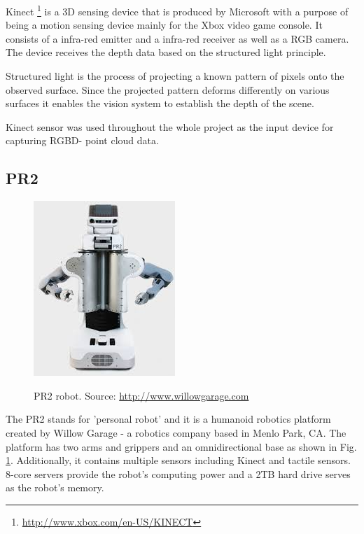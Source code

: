 Kinect \footnote{\url{http://www.xbox.com/en-US/KINECT}} is a 3D sensing device that is produced by Microsoft with a purpose of being a motion sensing device mainly for the Xbox video game console. It consists of a infra-red emitter and a infra-red receiver as well as a RGB camera. The device receives the depth data based on the structured light principle. 

Structured light is the process of projecting a known pattern of pixels onto the observed surface. Since the projected pattern deforms differently on various surfaces it enables  the vision system to establish the depth of the scene.

Kinect sensor was used throughout the whole project as the input device for capturing RGBD- point cloud  data.

\subsection{PR2}

\begin{figure}

{\includegraphics[width=0.5\columnwidth]{figures/pr2.jpeg}}

\caption{PR2 robot. Source: \url{http://www.willowgarage.com}}
\label{fig:pr2}
\end{figure}

The PR2 stands for 'personal robot' and it is a humanoid robotics platform created by Willow Garage - a robotics company based in Menlo Park, CA. The platform has two arms and grippers and an omnidirectional base as shown in Fig. \ref{fig:pr2}. Additionally, it contains multiple sensors including Kinect and tactile sensors. 8-core servers provide the robot's computing power and a 2TB hard drive serves as the robot's memory.  

